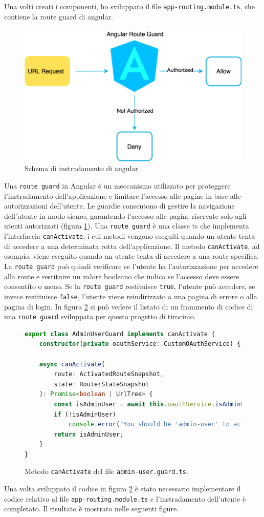 Una volti creati i componenti, ho sviluppato il file \texttt{app-routing.module.ts}, che contiene la route guard di \gls{angular}. 
\begin{figure}[H]
\centering
\includegraphics[width=.8\textwidth]{Images/routeguard.png}
\caption{\label{fig:routeguard}Schema di instradamento di \gls{angular}.}
\end{figure}
Una \texttt{route guard} in Angular è un meccanismo utilizzato per proteggere l'instradamento dell’applicazione e limitare l’accesso alle pagine in base alle autorizzazioni dell’utente. Le guardie consentono di gestire la navigazione dell’utente in modo sicuro, garantendo l’accesso alle pagine riservate solo agli utenti autorizzati (figura \ref{fig:routeguard}).
Una \texttt{route guard} è una classe \acrlong{ts} che implementa l’interfaccia \texttt{canActivate}, i cui metodi vengono eseguiti quando un utente tenta di accedere a una determinata rotta dell’applicazione.
Il metodo \texttt{canActivate}, ad esempio, viene eseguito quando un utente tenta di accedere a una route specifica. La \texttt{route guard} può quindi verificare se l’utente ha l’autorizzazione per accedere alla route e restituire un valore booleano che indica se l’accesso deve essere consentito o meno. Se la \texttt{route guard} restituisce \texttt{true}, l’utente può accedere, se invece restituisce \texttt{false}, l’utente viene reindirizzato a una pagina di errore o alla pagina di login. In figura \ref{fig:route guard} si può vedere il listato di un frammento di codice di una \texttt{route guard} sviluppata per questo progetto di tirocinio.
\begin{figure}[H]
\centering
\begin{lstlisting}[language=TypeScript]
export class AdminUserGuard implements canActivate {
    constructor(private oauthService: CustomOAuthService) {}

    async canActivate(
        route: ActivatedRouteSnapshot,
        state: RouterStateSnapshot
    ): Promise<boolean | UrlTree> {
        const isAdminUser = await this.oauthService.isAdminUser();
        if (!isAdminUser)
            console.error("You should be 'admin-user' to activate this route!");
        return isAdminUser;
    }
}
\end{lstlisting}
\caption{\label{fig:route guard}Metodo \texttt{canActivate} del file \texttt{admin-user.guard.ts}.}
\end{figure}
Una volta sviluppato il codice in figura \ref{fig:route guard} è stato necessario implementare il codice relativo al file \texttt{app-routing.module.ts} e l'instradamento dell'utente è completato. Il risultato è mostrato nelle seguenti figure.


